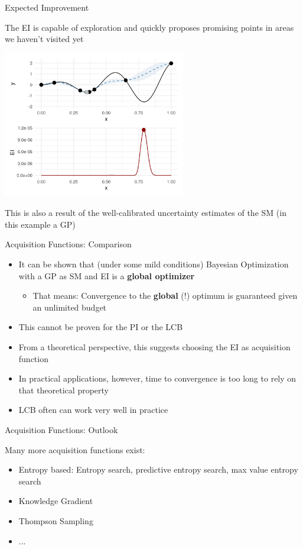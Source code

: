 \documentclass[11pt,compress,t,notes=noshow, xcolor=table]{beamer}
\begin{document}
\begin{frame}{Expected Improvement}

The EI is capable of exploration and quickly proposes promising points in areas we haven't visited yet

\begin{center}
  \includegraphics[width = 0.6\textwidth]{figure_man/bayesian_loop_6.png}
\end{center}

This is also a result of the well-calibrated uncertainty estimates of the SM (in this example a GP)

\end{frame}

\begin{frame}{Acquisition Functions: Comparison}

\begin{itemize}
  \item It can be shown that (under some mild conditions) Bayesian Optimization with a GP as SM and EI is a \textbf{global optimizer}
  \begin{itemize}
    \item That means: Convergence to the \textbf{global} (!) optimum is guaranteed given an unlimited budget
  \end{itemize}
  \item This cannot be proven for the PI or the LCB
  \item From a theoretical perspective, this suggests choosing the EI as acquisition function
  \item In practical applications, however, time to convergence is too long to rely on that theoretical property
  \item LCB often can work very well in practice
\end{itemize}

\end{frame}

\begin{frame}{Acquisition Functions: Outlook}

Many more acquisition functions exist:

\begin{itemize}
  \item Entropy based: Entropy search, predictive entropy search, max value entropy search
  \item Knowledge Gradient
  \item Thompson Sampling
  \item ...
\end{itemize}

\end{frame}

\endlecture
\end{document}

